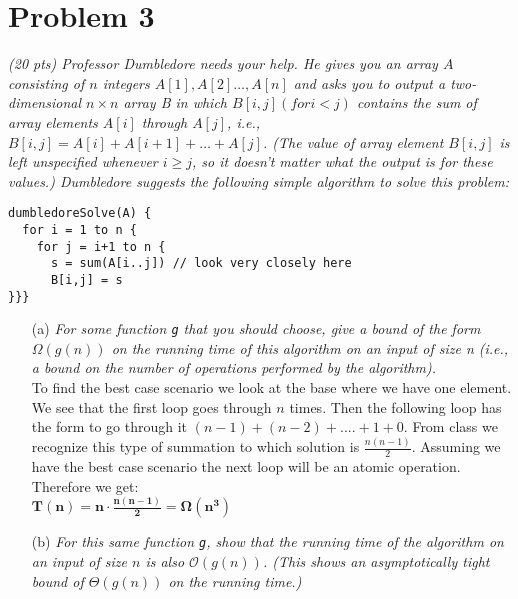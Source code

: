 \documentclass[12pt]{article} \setlength{\oddsidemargin}{0in}
\begin{document}
{\begin{enumerate}
\end{enumerate}

\newpage

\section*{Problem 3}

\textit{(20 pts) Professor Dumbledore needs your help. He gives you an
  array $A$ consisting of $n$ integers $A[1],A[2]\dots,A[n]$ and asks
  you to output a two-dimensional $n \times n$ array B in which
  $B[i, j] (for i < j)$ contains the sum of array elements $A[i]$
  through $A[j]$, i.e., $B[i, j] = A[i] + A[i + 1] + \dots +
  A[j]$. (The value of array element $B[i, j]$ is left unspecified
  whenever $i \ge j$, so it doesn't matter what the output is for these
  values.) Dumbledore suggests the following simple algorithm to solve
  this problem:}

\begin{verbatim}
dumbledoreSolve(A) {
  for i = 1 to n {
    for j = i+1 to n {
      s = sum(A[i..j]) // look very closely here
      B[i,j] = s
}}}
\end{verbatim}

\begin{enumerate}
\item[(a)]{\textit{For some function \texttt{g} that you should choose, give a		%
    bound of the form $\Omega(g(n))$ on the running time of this algorithm
    on an input of size n (i.e., a bound on the number of operations
    performed by the algorithm).}}\\
  
 To find the best case scenario we look at the base where we have one element. We see that the first loop goes through $n$ times. Then the following loop has the form to go through it $(n-1) + (n-2) + .... + 1 + 0$. From class we recognize this type of summation to which solution is $\frac{n(n-1)}{2}$. Assuming we have the best case scenario the next loop will be an atomic operation. Therefore we get:\\
 $\mathbf{T(n) = n \cdot \frac{n(n-1)}{2} = \Omega(n^3)}$
  
 
\item[(b)]{\textit{For this same function \texttt{g}, show that the running		%
    time of the algorithm on an input of size $n$ is also
    $\mathcal{O}(g(n))$. (This shows an asymptotically tight bound of
    $\Theta(g(n))$ on the running time.)}}\\
  

\end{enumerate}}
\end{document}
